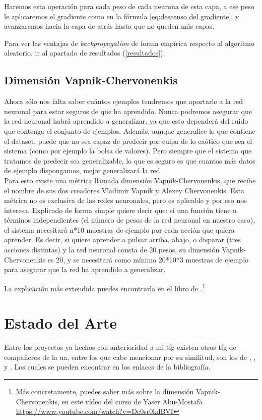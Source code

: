 Haremos esta operación para cada peso de cada neurona de esta capa, a ese peso le aplicaremos el gradiente como en la fórmula \ref{eq:descenso del gradiente}, y avanzaremos hacia la capa de atrás hasta que no queden más capas.

Para ver las ventajas de \textit{backpropagation} de forma empírica respecto al algoritmo aleatorio, ir al apartado de resultados (\ref{resultados}).

\subsection{Dimensión Vapnik-Chervonenkis}
Ahora sólo nos falta saber cuántos ejemplos tendremos que aportarle a la red neuronal para estar seguros de que ha aprendido. Nunca podremos asegurar que la red neuronal habrá aprendido a generalizar, ya que esto dependerá del ruido que contenga el conjunto de ejemplos. Además, aunque generalice lo que contiene el dataset, puede que no sea capaz de predecir por culpa de lo caótico que sea el sistema (como por ejemplo la bolsa de valores). Pero siempre que el sistema que tratamos de predecir sea generalizable, lo que es seguro es que cuantos más datos de ejemplo dispongamos, mejor generalizará la red. 
\\
Para esto existe una métrica llamada dimensión Vapnik-Chervonenkis, que recibe el nombre de sus dos creadores Vladimir Vapnik y Alexey Chervonenkis. Esta métrica no es exclusiva de las redes neuronales, pero es aplicable y por eso nos interesa. Explicado de forma simple quiere decir que: si una función tiene n términos independientes (el número de pesos de la red neuronal en nuestro caso), el sistema necesitará n*10 muestras de ejemplo por cada acción que quiera aprender. Es decir, si quiere aprender a pulsar arriba, abajo, o disparar (tres acciones distintas) y la red neuronal consta de 20 pesos, su dimensión Vapnik-Chervonenkis es 20, y se necesitará como mínimo 20*10*3 muestras de ejemplo para asegurar que la red ha aprendido a generalizar.

La explicación más extendida puedes encontrarla en el libro de \cite{LearningFromData}.\footnote{Más concretamente, puedes saber más sobre la dimensión Vapnik-Chervonenkis, en este vídeo del curso de Yaser Abu-Mostafa \url{https://www.youtube.com/watch?v=Dc0sr0kdBVI}}

\section{Estado del Arte}
Entre los proyectos ya hechos con anterioridad a mi \gls{tfg} existen otros \gls{tfg} de compañeros de la \gls{ua}, entre los que cabe mencionar por su similitud, son los de \cite{tfg-ia-1}, \cite{tfg-ia-2}, \cite{tfg-ia-3} y \cite{tfg-ia-4}. Los cuales se pueden encontrar en los enlaces de la bibliografía.

